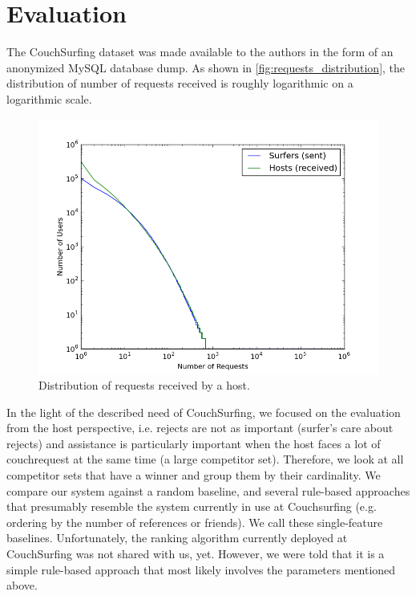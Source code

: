 \section{Evaluation} \label{sec:evaluation}

The CouchSurfing dataset was made available to the authors in the form of an anonymized MySQL database dump.
As shown in \autoref{fig:requests_distribution}, the distribution of number of requests received is roughly logarithmic on a logarithmic scale.

\begin{figure}[ht]
\centering
\includegraphics[width=1\linewidth]{figures/req_received_dist2.png}
\caption{Distribution of requests received by a host. }
\label{fig:requests_distribution}
\end{figure}

In the light of the described need of CouchSurfing, we focused on the evaluation from the host perspective, i.e. rejects are not as important (surfer's care about rejects) and assistance is particularly important when the host faces a lot of couchrequest at the same time (a large competitor set). Therefore, we look at all competitor sets that have a winner and group them by their cardinality. We compare our system against a random baseline, and several rule-based approaches that presumably resemble the system currently in use at Couchsurfing (e.g. ordering by the number of references or friends). We call these single-feature baselines. Unfortunately, the ranking algorithm currently deployed at CouchSurfing was not shared with us, yet. However, we were told that it is a simple rule-based approach that most likely involves the parameters mentioned above.


